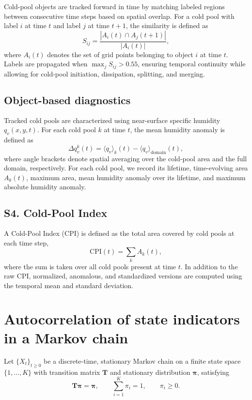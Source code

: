 \documentclass[11pt]{article}
\begin{document}
Cold-pool objects are tracked forward in time by matching labeled regions between consecutive time
steps based on spatial overlap. For a cold pool with label $i$ at time $t$ and label $j$ at time $t+1$,
the similarity is defined as
\begin{equation}
S_{ij} = \frac{|A_i(t) \cap A_j(t+1)|}{|A_i(t)|},
\end{equation}
where $A_i(t)$ denotes the set of grid points belonging to object $i$ at time $t$. Labels are
propagated when $\max_j S_{ij} > 0.55$, ensuring temporal continuity while allowing for cold-pool
initiation, dissipation, splitting, and merging.

\subsection*{Object-based diagnostics}

Tracked cold pools are characterized using near-surface specific humidity $q_v(x,y,t)$. For each cold
pool $k$ at time $t$, the mean humidity anomaly is defined as
\begin{equation}
\Delta q_v^k(t) = \langle q_v \rangle_k(t) - \langle q_v \rangle_{\mathrm{domain}}(t),
\end{equation}
where angle brackets denote spatial averaging over the cold-pool area and the full domain,
respectively. For each cold pool, we record its lifetime, time-evolving area $A_k(t)$, maximum area,
mean humidity anomaly over its lifetime, and maximum absolute humidity anomaly.

\subsection*{S4. Cold-Pool Index}

A Cold-Pool Index (CPI) is defined as the total area covered by cold pools at each time step,
\begin{equation}
\mathrm{CPI}(t) = \sum_k A_k(t),
\end{equation}
where the sum is taken over all cold pools present at time $t$. In addition to the raw CPI, normalized,
anomalous, and standardized versions are computed using the temporal mean and standard deviation.


\section{Autocorrelation of state indicators in a Markov chain}

Let $\{X_t\}_{t\ge 0}$ be a discrete-time, stationary Markov chain on a finite
state space $\{1,\dots,K\}$ with transition matrix $\mathbf{T}$ and stationary
distribution $\boldsymbol{\pi}$, satisfying
\begin{equation}
    \mathbf{T}\boldsymbol{\pi} = \boldsymbol{\pi},
    \qquad
    \sum_{i=1}^K \pi_i = 1,
    \qquad
    \pi_i \ge 0.
\end{equation}
\end{document}
